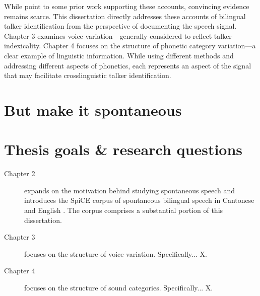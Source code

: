 While \citet{orena_2019_identifying} point to some prior work supporting these accounts, convincing evidence remains scarce. This dissertation directly addresses these accounts of bilingual talker identification from the perspective of documenting the speech signal. Chapter 3 examines voice variation---generally considered to reflect talker-indexicality. Chapter 4 focuses on the structure of phonetic category variation---a clear example of linguistic information. While using different methods and addressing different aspects of phonetics, each represents an aspect of the signal that may facilitate crosslinguistic talker identification.


\section{But make it spontaneous}\label{ch1:sec:spontaneous}

\section{Thesis goals \& research questions}\label{ch1:sec:goals}
\begin{description}
    \item[Chapter 2] expands on the motivation behind studying spontaneous speech and introduces the SpiCE corpus of spontaneous bilingual speech in Cantonese and English \citep{johnson_2021_spice}. The corpus comprises a substantial portion of this dissertation.
    \item[Chapter 3] focuses on the structure of voice variation. Specifically... X.
    \item[Chapter 4] focuses on the structure of sound categories. Specifically... X.
\end{description}

\endinput %
